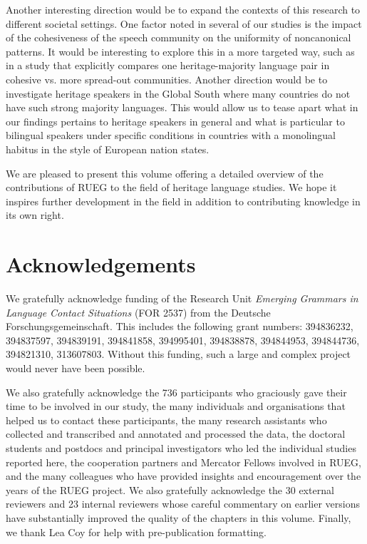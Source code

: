\documentclass[output=paper,colorlinks,citecolor=brown]{langscibook}
\begin{document}
Another interesting direction would be to expand the contexts of this research to different societal settings. One factor noted in several of our studies is the impact of the cohesiveness of the speech community on the uniformity of noncanonical patterns. It would be interesting to explore this in a more targeted way, such as in a study that explicitly compares one heritage-majority language pair in cohesive vs. more spread-out communities. Another direction would be to investigate heritage speakers in the Global South where many countries do not have such strong majority languages. This would allow us to tease apart what in our findings pertains to heritage speakers in general and what is particular to bilingual speakers under specific conditions in countries with a monolingual habitus in the style of European nation states.

We are pleased to present this volume offering a detailed overview of the contributions of RUEG to the field of heritage language studies. We hope it inspires further development in the field in addition to contributing knowledge in its own right.


\section*{Acknowledgements}
\begin{sloppypar}
We gratefully acknowledge funding of the Research Unit \textit{Emerging Grammars in Language Contact Situations} (FOR 2537) from the Deutsche Forschungsgemeinschaft. This includes the following grant numbers: 394836232, 394837597, 394839191, 394841858, 394995401, 394838878, 394844953, 394844736, 394821310, 313607803. Without this funding, such a large and complex project would never have been possible.
\end{sloppypar}

We also gratefully acknowledge the 736 participants who graciously gave their time to be involved in our study, the many individuals and organisations that helped us to contact these participants, the many research assistants who collected and transcribed and annotated and processed the data, the doctoral students and postdocs and principal investigators who led the individual studies reported here, the cooperation partners and Mercator Fellows involved in RUEG, and the many colleagues who have provided insights and encouragement over the years of the RUEG project. We also gratefully acknowledge the 30 external reviewers and 23 internal reviewers whose careful commentary on earlier versions have substantially improved the quality of the chapters in this volume. Finally, we thank Lea Coy for help with pre-publication formatting.

\printbibliography[heading=subbibliography,notkeyword=this]
\end{document}

